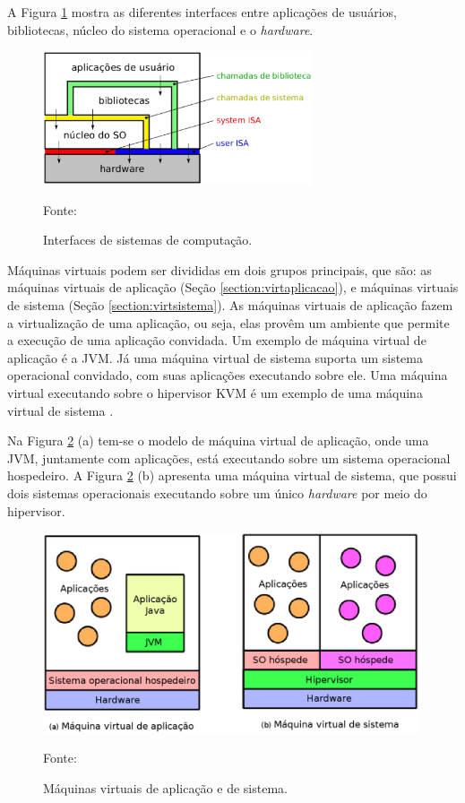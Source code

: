 A Figura \ref{fig:interfaces_isa} mostra as diferentes interfaces entre aplicações de usuários, bibliotecas, núcleo do sistema operacional e o 
\textit{hardware}.

\begin{figure}[h!]
 \centering
 \includegraphics[width=300px]{img/interfaces_isa.eps}
 \caption{Interfaces de sistemas de computação.}
 \label{fig:interfaces_isa}
 Fonte: \citet{maziero2013}
\end{figure}

Máquinas virtuais podem ser divididas em dois grupos principais, que são: as máquinas virtuais de aplicação (Seção \ref{section:virtaplicacao}), 
e máquinas virtuais de sistema (Seção \ref{section:virtsistema}). As máquinas virtuais de aplicação fazem a virtualização de uma aplicação, 
ou seja, elas provêm um ambiente que permite a execução de uma aplicação convidada. Um exemplo de máquina virtual de aplicação é a \ac{JVM}. 
Já uma máquina virtual de sistema suporta um sistema operacional convidado, com suas aplicações executando sobre ele. Uma máquina virtual 
executando sobre o hipervisor \ac{KVM} \cite{kvm} é um exemplo de uma máquina virtual de sistema \cite{laureano2008}.

Na Figura \ref{fig:vms_tipos} (a) tem-se o modelo de máquina virtual de aplicação, onde uma \ac{JVM}, juntamente com aplicações, está executando 
sobre um sistema operacional hospedeiro. A Figura \ref{fig:vms_tipos} (b) apresenta uma máquina virtual de sistema, que possui dois sistemas 
operacionais executando sobre um único \textit{hardware} por meio do hipervisor.

\begin{figure}[h!]
 \centering
 \includegraphics[width=420px]{img/vms_tipos.eps}
 \caption{Máquinas virtuais de aplicação e de sistema.}
 \label{fig:vms_tipos}
 Fonte: \citet{laureano2008}
\end{figure}

